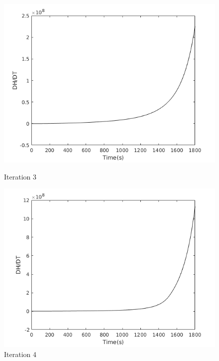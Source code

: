 \begin{figure}[h!]
  \centering
  \begin{minipage}[b]{0.4\textwidth}
    \includegraphics[width=\textwidth]{h3.png}
    \caption{Iteration 3}
  \end{minipage}
  \hfill
  \begin{minipage}[b]{0.4\textwidth}
    \includegraphics[width=\textwidth]{h4.png}
    \caption{Iteration 4}
  \end{minipage}
\end{figure}
